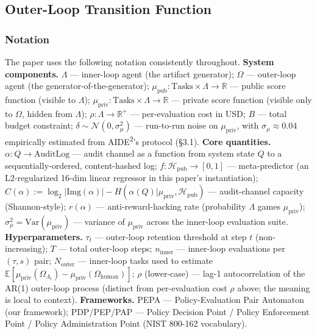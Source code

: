 \subsection{Outer-Loop Transition Function}

\subsubsection*{Notation}

The paper uses the following notation consistently throughout. \textbf{System components.} $\Lambda$ --- inner-loop agent (the artifact generator); $\Omega$ --- outer-loop agent (the generator-of-the-generator); $\mu_{\text{pub}} : \text{Tasks} \times \Lambda \to \mathbb{R}$ --- public score function (visible to $\Lambda$); $\mu_{\text{priv}} : \text{Tasks} \times \Lambda \to \mathbb{R}$ --- private score function (visible only to $\Omega$, hidden from $\Lambda$); $\rho : \Lambda \to \mathbb{R}^+$ --- per-evaluation cost in USD; $B$ --- total budget constraint; $\delta \sim \mathcal{N}(0, \sigma^2_\mu)$ --- run-to-run noise on $\mu_{\text{priv}}$, with $\sigma_\mu \approx 0.04$ empirically estimated from AIDE\textsuperscript{2}'s protocol (\S3.1). \textbf{Core quantities.} $\alpha : Q \to \text{AuditLog}$ --- audit channel as a function from system state $Q$ to a sequentially-ordered, content-hashed log; $f : \mathcal{H}_{\text{pub}} \to [0,1]$ --- meta-predictor (an L2-regularized 16-dim linear regressor in this paper's instantiation); $C(\alpha) := \log_2 |\text{Img}(\alpha)| - H(\alpha(Q) | \mu_{\text{priv}}, \mathcal{H}_{\text{pub}})$ --- audit-channel capacity (Shannon-style); $r(\alpha)$ --- anti-reward-hacking rate (probability $\Lambda$ games $\mu_{\text{priv}}$); $\sigma^2_\mu = \mathrm{Var}(\mu_{\text{priv}})$ --- variance of $\mu_{\text{priv}}$ across the inner-loop evaluation suite. \textbf{Hyperparameters.} $\tau_t$ --- outer-loop retention threshold at step $t$ (non-increasing); $T$ --- total outer-loop steps; $n_{\text{inner}}$ --- inner-loop evaluations per $(\tau, s)$ pair; $N_{\text{outer}}$ --- inner-loop tasks used to estimate $\mathbb{E}[\mu_{\text{priv}}(\Omega_{\Lambda_t}) - \mu_{\text{priv}}(\Omega_{\text{human}})]$; $\rho$ (lower-case) --- lag-1 autocorrelation of the AR(1) outer-loop process (distinct from per-evaluation cost $\rho$ above; the meaning is local to context). \textbf{Frameworks.} PEPA --- Policy-Evaluation Pair Automaton (our framework); PDP/PEP/PAP --- Policy Decision Point / Policy Enforcement Point / Policy Administration Point (NIST 800-162 vocabulary).

